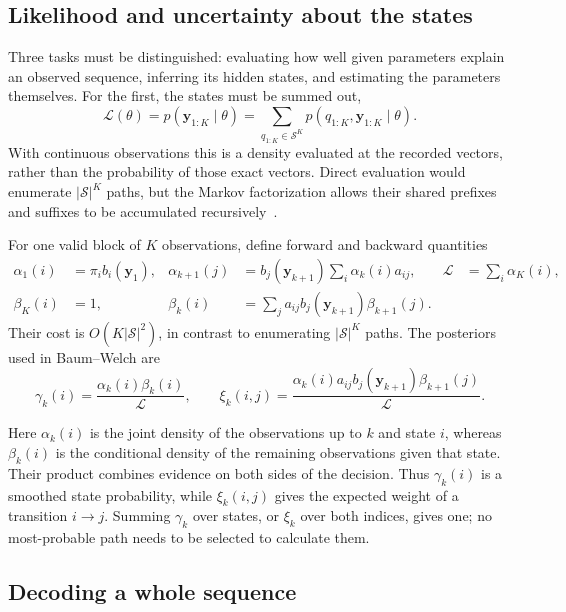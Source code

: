 \subsection{Likelihood and uncertainty about the states}

Three tasks must be distinguished: evaluating how well given parameters explain an
observed sequence, inferring its hidden states, and estimating the parameters themselves.
For the first, the states must be summed out,
\begin{equation}
 \mathcal L(\theta)=p(\mathbf y_{1:K}\mid\theta)
 =\sum_{q_{1:K}\in\mathcal S^K}p(q_{1:K},\mathbf y_{1:K}\mid\theta).
 \label{eq:hmm-likelihood}
\end{equation}
With continuous observations this is a density evaluated at the recorded vectors, rather
than the probability of those exact vectors. Direct evaluation would enumerate
$|\mathcal S|^K$ paths, but the Markov factorization allows their shared prefixes and
suffixes to be accumulated recursively~\cite[Sec.~III-A]{rabiner1989}.

For one valid block of $K$ observations, define forward and backward quantities
\begin{align}
 \alpha_1(i)&=\pi_i b_i(\mathbf y_1),&
 \alpha_{k+1}(j)&=b_j(\mathbf y_{k+1})\sum_i\alpha_k(i)a_{ij},
 &\mathcal L&=\sum_i\alpha_K(i),\label{eq:forward}\\
 \beta_K(i)&=1,&
 \beta_k(i)&=\sum_j a_{ij}b_j(\mathbf y_{k+1})\beta_{k+1}(j).
 &&\label{eq:backward}
\end{align}
Their cost is $O(K|\mathcal S|^2)$, in contrast to enumerating $|\mathcal S|^K$ paths.
The posteriors used in Baum--Welch are
\begin{equation}
 \gamma_k(i)=\frac{\alpha_k(i)\beta_k(i)}{\mathcal L},\qquad
 \xi_k(i,j)=\frac{\alpha_k(i)a_{ij}b_j(\mathbf y_{k+1})\beta_{k+1}(j)}{\mathcal L}.
\end{equation}

Here $\alpha_k(i)$ is the joint density of the observations up to $k$ and state $i$,
whereas $\beta_k(i)$ is the conditional density of the remaining observations given that
state. Their product combines evidence on both sides of the decision. Thus
$\gamma_k(i)$ is a smoothed state probability, while $\xi_k(i,j)$ gives the expected
weight of a transition $i\to j$. Summing $\gamma_k$ over states, or $\xi_k$ over both
indices, gives one; no most-probable path needs to be selected to calculate them.

\subsection{Decoding a whole sequence}

